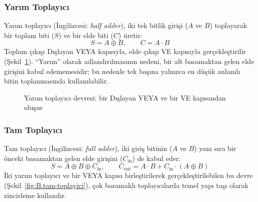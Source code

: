 \subsubsection{Yarım Toplayıcı}

Yarım toplayıcı (İngilizcesi: \textit{half adder}), iki tek bitlik girişi ($A$ ve $B$) toplayarak bir toplam biti ($S$) ve bir elde biti ($C$) üretir:
\[
S = A \oplus B, \qquad C = A \cdot B
\]
Toplam çıkışı Dışlayan VEYA kapısıyla, elde çıkışı VE kapısıyla gerçekleştirilir (Şekil~\ref{fig:B.yarim-toplayici}). ``Yarım'' olarak adlandırılmasının nedeni, bir alt basamaktan gelen elde girişini kabul edememesidir; bu nedenle tek başına yalnızca en düşük anlamlı bitin toplanmasında kullanılabilir.

\begin{figure}[H]
\centering
{}
\caption{Yarım toplayıcı devresi: bir Dışlayan VEYA ve bir VE kapısından oluşur}
\label{fig:B.yarim-toplayici}
\end{figure}

\subsubsection{Tam Toplayıcı}

Tam toplayıcı (İngilizcesi: \textit{full adder}), iki giriş bitinin ($A$ ve $B$) yanı sıra bir önceki basamaktan gelen elde girişini ($C_{\text{in}}$) de kabul eder:
\[
S = A \oplus B \oplus C_{\text{in}}, \qquad C_{\text{out}} = A \cdot B + C_{\text{in}} \cdot (A \oplus B)
\]
İki yarım toplayıcı ve bir VEYA kapısı birleştirilerek gerçekleştirilebilen bu devre (Şekil~\ref{fig:B.tam-toplayici}), çok basamaklı toplayıcılarda temel yapı taşı olarak zincirleme kullanılır.

